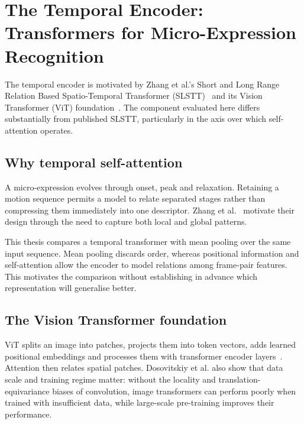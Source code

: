 
\section{The Temporal Encoder: Transformers for Micro-Expression Recognition}
\label{sec:transformer-review}

The temporal encoder is motivated by Zhang et al.'s Short and Long Range Relation Based Spatio-Temporal Transformer (SLSTT)~\cite{zhang2022} and its Vision Transformer (ViT) foundation~\cite{dosovitskiy2021}. The component evaluated here differs substantially from published SLSTT, particularly in the axis over which self-attention operates.

\subsection{Why temporal self-attention}
\label{sec:transformer-why}

A micro-expression evolves through onset, peak and relaxation. Retaining a motion sequence permits a model to relate separated stages rather than compressing them immediately into one descriptor. Zhang et al.~\cite{zhang2022} motivate their design through the need to capture both local and global patterns.

This thesis compares a temporal transformer with mean pooling over the same input sequence. Mean pooling discards order, whereas positional information and self-attention allow the encoder to model relations among frame-pair features. This motivates the comparison without establishing in advance which representation will generalise better.

\subsection{The Vision Transformer foundation}
\label{sec:transformer-vit}

ViT splits an image into patches, projects them into token vectors, adds learned positional embeddings and processes them with transformer encoder layers~\cite{dosovitskiy2021}. Attention then relates spatial patches. Dosovitskiy et al. also show that data scale and training regime matter: without the locality and translation-equivariance biases of convolution, image transformers can perform poorly when trained with insufficient data, while large-scale pre-training improves their performance.

